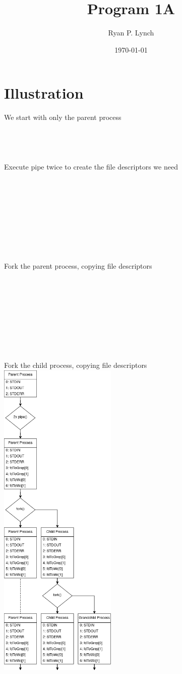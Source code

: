 \documentclass[a4paper,11pt,twoside]{article}
\author{Ryan P. Lynch}
\date{\today}
\title{Program 1A}
\begin{document}
\maketitle

\section*{Illustration}
\label{sec:org7caec53}
\begin{multicols}{2}
\noindent
We start with only the parent process\\
\\
\\
\\
\\
Execute pipe twice to create the file descriptors we need\\
\\
\\
\\
\\
\\
\\
\\
\\
\\
Fork the parent process, copying file descriptors\\
\\
\\
\\
\\
\\
\\
\\
\\
\\
Fork the child process, copying file descriptors\\
\vfill\null
\columnbreak
\includegraphics[width=0.42\textwidth]{flow-diagram.drawio0}
\end{multicols}
\end{document}
